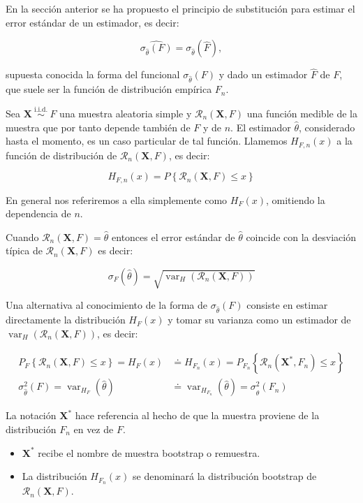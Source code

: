 \documentclass[
]{article}
\providecommand{\tightlist}{%
  \setlength{\itemsep}{0pt}\setlength{\parskip}{0pt}}
\begin{document}
En la sección anterior se ha propuesto el principio de substitución para estimar el error estándar de un estimador, es decir:

\[
\widehat{\sigma_{\hat{\theta}}(F)}=\sigma_{\hat{\theta}}(\hat{F}),
\]

supuesta conocida la forma del funcional \(\sigma_{\hat{\theta}}(F)\) y dado un estimador \(\hat{F}\) de \(F\), que suele ser la función de distribución empírica \(F_{n}\).

Sea \(\mathbf{X} \stackrel{\text { i.i.d. }}{\sim} F\) una muestra aleatoria simple y \(\mathcal{R}_{n}(\mathbf{X}, F)\) una función medible de la muestra que por tanto depende también de \(F\) y de \(n\). El estimador \(\hat{\theta}\), considerado hasta el momento, es un caso particular de tal función. Llamemos \(H_{F, n}(x)\) a la función de distribución de \(\mathcal{R}_{n}(\mathbf{X}, F)\), es decir:

\[
H_{F, n}(x)=P\left\{\mathcal{R}_{n}(\mathbf{X}, F) \leq x\right\}
\]

En general nos referiremos a ella simplemente como \(H_{F}(x)\), omitiendo la dependencia de \(n\).

Cuando \(\mathcal{R}_{n}(\mathbf{X}, F)=\hat{\theta}\) entonces el error estándar de \(\hat{\theta}\) coincide con la desviación típica de \(\mathcal{R}_{n}(\mathbf{X}, F)\) es decir:

\[
\sigma_{F}(\hat{\theta})=\sqrt{\operatorname{var}_{H}\left(\mathcal{R}_{n}(\mathbf{X}, F)\right)}
\]

Una alternativa al conocimiento de la forma de \(\sigma_{\hat{\theta}}(F)\) consiste en estimar directamente la distribución \(H_{F}(x)\) y tomar su varianza como un estimador de \(\operatorname{var}_{H}\left(\mathcal{R}_{n}(\mathbf{X}, F)\right)\), es decir:

\[
\begin{aligned}
P_{F}\left\{\mathcal{R}_{n}(\mathbf{X}, F) \leq x\right\}=H_{F}(x) & \doteq H_{F_{n}}(x)=P_{F_{n}}\left\{\mathcal{R}_{n}\left(\mathbf{X}^{*}, F_{n}\right) \leq x\right\} \\
\sigma_{\hat{\theta}}^{2}(F)=\operatorname{var}_{H_{F}}(\hat{\theta}) & \doteq \operatorname{var}_{H_{F_{n}}}(\hat{\theta})=\sigma_{\hat{\theta}}^{2}\left(F_{n}\right)
\end{aligned}
\]

La notación \(\mathbf{X}^{*}\) hace referencia al hecho de que la muestra proviene de la distribución \(F_{n}\) en vez de \(F\).

\begin{itemize}
\tightlist
\item
  \(\mathbf{X}^{*}\) recibe el nombre de muestra bootstrap o remuestra.
\item
  La distribución \(H_{F_{n}}(x)\) se denominará la distribución bootstrap de \(\mathcal{R}_{n}(\mathbf{X}, F)\).
\end{itemize}
\end{document}
